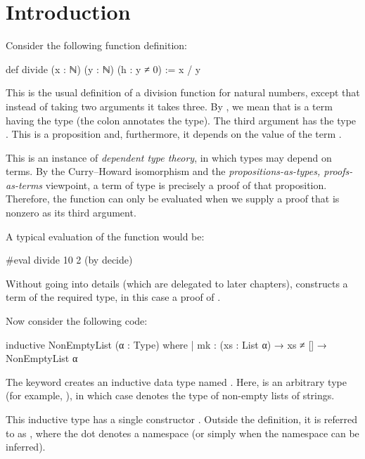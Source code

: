 \chapter{Introduction}

Consider the following function definition:

\begin{leanblock}
def divide (x : ℕ) (y : ℕ) (h : y ≠ 0) := x / y
\end{leanblock}

This is the usual definition of a division function for natural numbers, except that instead of
taking two arguments it takes three. By , we mean that  is a term having the
type  (the colon annotates the type). The third argument  has the type .
This is a proposition and, furthermore, it depends on the value of the term .

This is an instance of \emph{dependent type theory}, in which types may depend on terms.
By the Curry--Howard isomorphism and the \emph{propositions-as-types, proofs-as-terms}
viewpoint, a term of type  is precisely a proof of that proposition. Therefore, the
function  can only be evaluated when we supply a proof that  is nonzero as its
third argument.

A typical evaluation of the function would be:

\begin{leanblock}
#eval divide 10 2 (by decide)
\end{leanblock}

Without going into details (which are delegated to later chapters),  constructs
a term of the required type, in this case a proof of .

\bigskip

Now consider the following code:

\begin{leanblock}
inductive NonEmptyList (α : Type) where
| mk : (xs : List α) → xs ≠ [] → NonEmptyList α
\end{leanblock}

The keyword  creates an inductive data type named .
Here,  is an arbitrary type (for example, ), in which case
 denotes the type of non-empty lists of strings.

This inductive type has a single constructor . Outside the definition, it is referred
to as , where the dot denotes a namespace (or simply  when
the namespace can be inferred).

